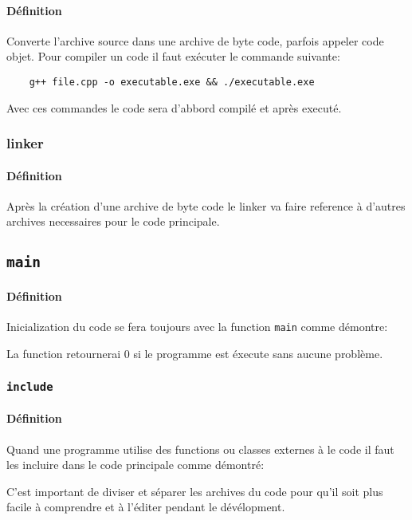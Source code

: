 \documentclass{article}
\begin{document}
\paragraph{Définition}Converte l'archive source dans une archive de byte code, parfois appeler code objet. Pour compiler un code il faut exécuter le commande suivante:
\begin{scriptsize}
    \mycode
    \begin{lstlisting}
    g++ file.cpp -o executable.exe && ./executable.exe
    \end{lstlisting}
\end{scriptsize}
Avec ces commandes le code sera d'abbord compilé et après executé.

\subsubsection{linker}
\paragraph{Définition}Après la création d'une archive de byte code le linker va faire reference à d'autres archives necessaires pour le code principale.

\subsection{\texttt{main}}
\paragraph{Définition}Inicialization du code se fera toujours avec la function \texttt{main} comme démontre:
\begin{scriptsize}
    \mycode
\end{scriptsize}
La function retournerai 0 si le programme est éxecute sans aucune problème.

\subsubsection{\texttt{include}}
\paragraph{Définition}Quand une programme utilise des functions ou classes externes à le code il faut les incluire dans le code principale comme démontré:
\begin{scriptsize}
    \mycode
\end{scriptsize}
C'est important de diviser et séparer les archives du code pour qu'il soit plus facile à comprendre et à l'éditer pendant le dévélopment.\\
\end{document}
